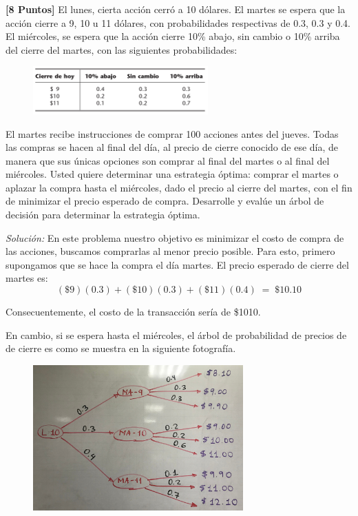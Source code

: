 \documentclass[ a4paper, twoside, 11pt]{article}
\begin{document}
\begin{problem}
\textbf{[8 Puntos]} El lunes, cierta acci\'on cerr\'o a 10 d\'olares. El martes se espera que la acci\'on cierre a 9, 10 u 11 d\'olares, con probabilidades respectivas de 0.3, 0.3 y 0.4. El mi\'ercoles, se espera que la acci\'on cierre 10\% abajo, sin cambio o 10\% arriba del cierre del martes, con las siguientes probabilidades: 

\begin{figure}[htb]
\centering
\includegraphics[width=0.6\textwidth]{problema-acciones.jpg}
\end{figure}

El martes recibe instrucciones de comprar 100 acciones antes del jueves. Todas las compras se hacen al final del d\'ia, al precio de cierre conocido de ese d\'ia, de manera que sus \'unicas opciones son comprar al final del martes o al final del mi\'ercoles. Usted quiere determinar una estrategia \'optima: comprar el martes o aplazar la compra hasta el mi\'ercoles, dado el precio al cierre del martes, con el fin de minimizar el precio esperado de compra. Desarrolle y eval\'ue un \'arbol de decisi\'on para determinar la estrategia \'optima. 
\end{problem}
\fullskip

\emph{Soluci\'on:} En este problema nuestro objetivo es minimizar el costo de compra de las acciones, \ie buscamos comprarlas al menor precio posible. Para esto, primero supongamos que se hace la compra el d\'ia martes. El precio esperado de cierre del martes es: 
\[
(\$9)(0.3) + (\$10)(0.3) + (\$11)(0.4) \; = \; \$10.10
\]

Consecuentemente, el costo de la transacci\'on ser\'ia de \$1010. 

En cambio, si se espera hasta el mi\'ercoles, el \'arbol de probabilidad de precios de de cierre es como se muestra en la siguiente fotograf\'ia. 

\begin{figure}[htb]
\centering
\includegraphics[width=0.72\textwidth]{problema-2.jpg}
\end{figure}
\end{document}
